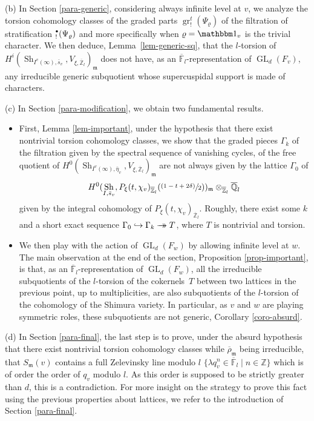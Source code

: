 \documentclass[JEP,XML,SOM,Unicode,published]{cedram}
\let\mathds\mathbbm
\newcommand{\NoChangel}[1]{%
\expandafter\let\csname old\string#1\endcsname=#1
\let#1=\relax
\newcommand{#1}{\mathcode`l="716C\csname old\string#1\endcsname\mathcode`l="7160 }%
}
\def\hto{\mathrel{\lhook\joinrel\to}}
\newcommand{\onto}{\mathchoice{\to\hspace*{-5mm}\to}{\to\hspace*{-2.85mm}\to}{\to\hspace*{-3mm}\to}{\to\hspace*{-3mm}\to}}
\let\sep\mid
\newcommand{\sbullet}{{\scriptscriptstyle\bullet}}
\newcommand{\csbullet}{{\raisebox{1pt}{$\sbullet$}}}
\newcommand{\psfrac}[2]{\sfrac{(#1)}{#2}}
\DeclareMathOperator{\GL}{GL}
\theoremstyle{plain}
\theoremstyle{definition}
\numberwithin{equation}{subsection}
\newcommand\Fm{{\mathbb F}}
\newcommand\Qm{{\mathbb Q}}
\newcommand\Zm{{\mathbb Z}}
\DeclareMathOperator{\sh}{Sh}
\DeclareMathOperator{\gr}{gr}
\DeclareMathOperator{\Fil}{Fil}\NoChangel{\Fil}
\let \oo=\infty
\begin{document}
(b) In Section \ref{para-generic}, considering always infinite level at $v$,
we analyze the torsion
coho\-mology classes of the graded parts $\gr^t_!(\Psi_\varrho)$ of the filtration of
stratification $\Fil^{\csbullet}_!(\Psi_{\varrho})$ and more specifically when
$\varrho=\mathds 1_v$ is the trivial character.
We then deduce, \cf Lem\-ma~\ref{lem-generic-sq}, that the $l$-torsion of
$H^i(\sh_{I^v(\oo),\bar s_v},V_{\xi,\overline \Zm_l})_{\mathfrak m}$
does not have, as an $\overline \Fm_l$\nobreakdash-representation of $\GL_d(F_v)$,
any irreducible generic subquotient whose supercuspidal support is made of
characters.

(c) In Section \ref{para-modification}, we obtain two fundamental results.
\begin{itemize}
\item First, \cf Lemma \ref{lem-important},
under the hypothesis that there exist nontrivial torsion cohomology classes, we show that
the graded pieces $\Gamma_k$ of the filtration given by the spectral sequence of
vanishing cycles, of the free quotient of
$H^0(\sh_{I^v(\oo),\bar \eta_v},V_{\xi,\overline \Zm_l})_{\mathfrak m}$
are not always given by the lattice $\Gamma_0$ of
\[
H^0(\sh_{I,\bar s_v},P_\xi(t,\chi_v)_{\overline \Zm_l}(\psfrac{1-t+2\delta}{2}))_{\mathfrak m}
\otimes_{\overline \Zm_l} \overline \Qm_l
\]
given by the integral cohomology of
$P_\xi(t,\chi_v)_{\overline \Zm_l}$. Roughly, there exist some $k$ and a short exact
sequence $\Gamma_0 \hto \Gamma_k \onto T$, where $T$ is nontrivial and torsion.

\item We then play with the action of $\GL_d(F_w)$ by allowing infinite level at $w$. The main
observation at the end of the section, \cf Proposition \ref{prop-important},
is that, as an $\overline \Fm_l$\nobreakdash-rep\-re\-sentation
of $\GL_d(F_w)$, all the irreducible subquotients of the $l$-torsion of the cokernels~$T$ between two lattices in the previous point, up to multiplicities,
are also subquotients of the $l$-torsion of the cohomology of the Shimura variety.
In particular,
as $v$ and $w$ are playing symmetric roles, these subquotients are not generic,
\cf Corollary \ref{coro-absurd}.
\end{itemize}

(d) In Section \ref{para-final}, the last step is to prove, under the absurd hypothesis that
there exist nontrivial torsion cohomology classes while
$\overline \rho_{\mathfrak m}$ being irreducible, that $S_{\mathfrak m}(v)$
contains a full Zelevinsky line modulo $l$
$\{\lambda q_v^n \in \overline \Fm_l\sep n \in \Zm\}$ which is of order the order
of $q_v$ modulo $l$. As this order is supposed to be strictly greater than $d$,
this is a contradiction. For more insight on the strategy to prove this fact using the previous
properties about lattices, we refer to
the introduction of Section \ref{para-final}.
\end{document}
